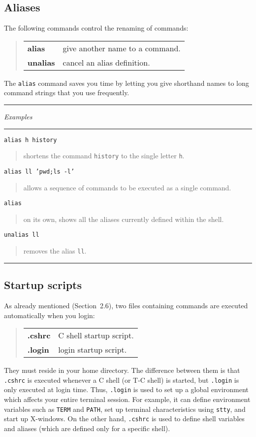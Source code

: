 \documentclass[twoside,11pt]{article}
\newcommand{\htmlref}[2]{#1}
\newcommand{\example}[2]{\goodbreak
                         {\tt #1}
                         \vspace*{-4mm}
                         \begin{quote}
                           {\small #2}
                         \end{quote}
                        }
\newcommand{\example}[2]{\goodbreak
                            {\tt #1}
                            \vspace*{-4mm}
                            \begin{quote}
                            {#2}
                            \end{quote}
                           }
\newcommand{\exbegin}{\begin{center}
                      \rule{18mm}{0.3mm}
                      {\em Examples}
                      \rule{18mm}{0.3mm}
                      \end{center}
                     }
\newcommand{\exend}{\begin{center}
                    \rule{50mm}{0.3mm}
                    \end{center}
                   }
\begin{document}
\subsection{Aliases\label{alias}}

The following commands control the renaming of commands:
\begin{quote}
\begin{tabular}{lp{67mm}}

{\bf alias}   & give another name to a command.\\
{\bf unalias} & cancel an alias definition.

\end{tabular}
\end{quote}

The {\tt alias} command saves you time by letting you give shorthand names to
long command strings that you use frequently.

\goodbreak

\exbegin

\example{alias h history}
{shortens the command {\tt history} to the single letter {\tt h}.}

\example{alias ll 'pwd;ls -l'}
{allows a sequence of commands to be executed as a single command.}

\example{alias}
{on its own, shows all the aliases currently defined within the shell.}

\example{unalias ll}
{removes the alias {\tt ll}.}

\exend

\subsection{Startup scripts\label{ss1}}

As already mentioned (\htmlref{Section~2.6}{suye}),
two files containing commands are executed automatically when you login:
\begin{quote}
\begin{tabular}{lp{67mm}}

{\bf .cshrc}  & C shell startup script.\\
{\bf .login}  & login startup script.

\end{tabular}
\end{quote}

They must reside in your home directory.
The difference between them is that {\tt .cshrc} is executed whenever a C shell
(or T-C shell) is started, but {\tt .login} is only executed at login time.
Thus, {\tt .login} is used to set up a global environment which affects your
entire terminal session.
For example, it can define environment variables such as {\tt TERM} and
{\tt PATH}, set up terminal characteristics using {\tt stty}, and start up
X-windows.
On the other hand, {\tt .cshrc} is used to define shell variables and aliases
(which are defined only for a specific shell).
\end{document}
